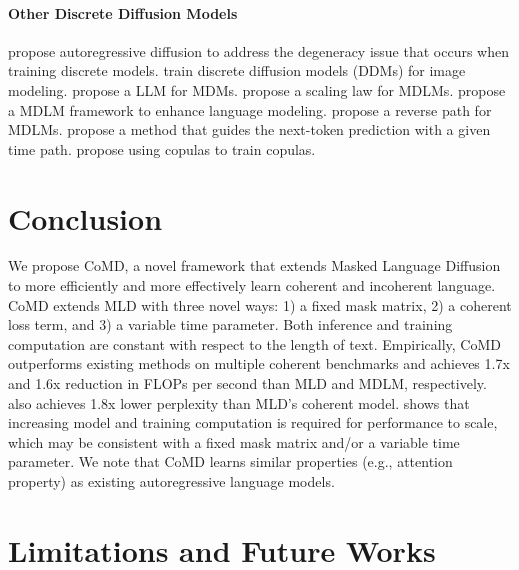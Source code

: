\paragraph{Other Discrete Diffusion Models}
\citet{hoogeboom2021argmax,hoogeboom2022autoregressive} propose autoregressive diffusion to address the degeneracy issue that occurs when training discrete models. \citet{chang2022maskgit} train discrete diffusion models (DDMs) for image modeling. \citet{wang2024diffusion} propose a LLM for MDMs. \citet{gong2024scaling} propose a scaling law for MDLMs. \citet{ni2024scaling} propose a MDLM framework to enhance language modeling. \citet{ye2024beyond} propose a reverse path for MDLMs. \citet{peng2025path} propose a method that guides the next-token prediction with a given time path. \citet{liu2024copula} propose using copulas to train copulas.


\section{Conclusion}

We propose CoMD, a novel framework that extends Masked Language Diffusion to more efficiently and more effectively learn coherent and incoherent language. CoMD extends MLD with three novel ways: 1) a fixed mask matrix, 2) a coherent loss term, and 3) a variable time parameter. Both inference and training computation are constant with respect to the length of text. Empirically, CoMD outperforms existing methods on multiple coherent benchmarks and achieves 1.7x and 1.6x reduction in FLOPs per second than MLD and MDLM, respectively. \ours also achieves 1.8x lower perplexity than MLD's coherent model. \citet{kaplan2020scaling,hoffmann2022trainingcomputeoptimalallarguement} shows that increasing model and training computation is required for performance to scale, which may be consistent with a fixed mask matrix and/or a variable time parameter. We note that CoMD learns similar properties (e.g., attention property) as existing autoregressive language models. 


\section{Limitations and Future Works}

